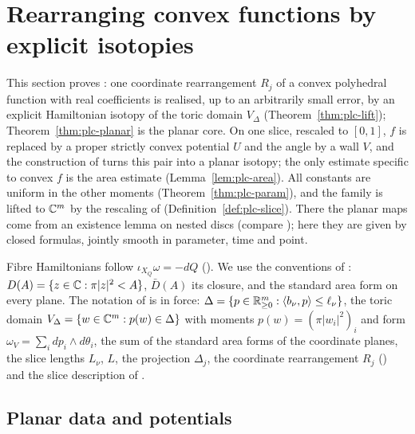 \section{Rearranging convex functions by explicit isotopies}\label{sec:plc}

This section proves : one coordinate rearrangement $R_j$ of a convex
polyhedral function with real coefficients is realised, up to an arbitrarily small error, by an explicit Hamiltonian
isotopy of the toric domain $V_\Delta$ (Theorem~\ref{thm:plc-lift}); Theorem~\ref{thm:plc-planar} is the planar core.
On one slice, rescaled to $[0,1]$, $f$ is replaced by a proper strictly convex potential $U$ and the angle by a wall $V$, and
the construction of  turns this pair into a planar isotopy; the only estimate specific to convex $f$ is
the area estimate (Lemma~\ref{lem:plc-area}). All constants are uniform in the other moments
(Theorem~\ref{thm:plc-param}), and the family is lifted to $\mathbb{C}^m$ by the rescaling of \cite[\S2.3]{OpenAI2026}
(Definition~\ref{def:plc-slice}). There the planar maps come from an existence lemma on nested discs (compare
\cite[Lemma~3.2]{SchlenkFolding}); here they are given by closed formulas, jointly smooth in parameter, time and point.

Fibre Hamiltonians follow $\iota_{X_Q}\omega=-dQ$ (). We use the conventions of
: $D(A)=\{z\in\mathbb{C}:\pi|z|^2<A\}$, $\bar D(A)$ its closure, and the standard area form on every plane.
The notation of  is in force: $\Delta=\{p\in\mathbb{R}^m_{\ge0}:\langle b_\nu,p\rangle\le\ell_\nu\}$, the toric
domain $V_\Delta=\{w\in\mathbb{C}^m:p(w)\in\Delta\}$ with moments $p(w)=(\pi|w_i|^2)_i$ and form
$\omega_V=\sum_idp_i\wedge d\theta_i$, the sum of the standard area forms of the coordinate planes, the slice lengths
$L_\nu$, $L$, the projection $\Delta_j$, the coordinate rearrangement $R_j$ ()
and the slice description of .

\subsection{Planar data and potentials}\label{sec:plc-potentials}

